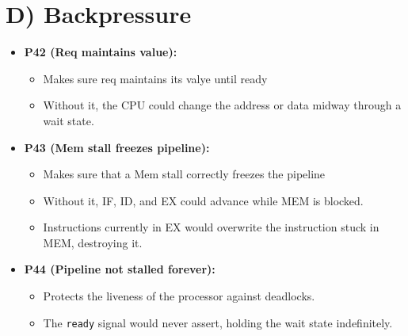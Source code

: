 \documentclass[11pt]{article}
\begin{document}
\begin{itemize}
\end{itemize}

\section*{D) Backpressure}
\begin{itemize}
    \item \textbf{P42 (Req maintains value):} 
    \begin{itemize}
        \item Makes sure req maintains its valye until ready
        \item Without it, the CPU could change the address or data midway through a wait state.
    \end{itemize}

    \item \textbf{P43 (Mem stall freezes pipeline):} 
    \begin{itemize}
        \item Makes sure that a Mem stall correctly freezes the pipeline
        \item Without it, IF, ID, and EX could advance while MEM is blocked.
        \item Instructions currently in EX would overwrite the instruction stuck in MEM, destroying it.
    \end{itemize}

    \item \textbf{P44 (Pipeline not stalled forever):} 
    \begin{itemize}
        \item Protects the liveness of the processor against deadlocks.
        \item The \texttt{ready} signal would never assert, holding the wait state indefinitely.
    \end{itemize}
\end{itemize}
\end{document}
